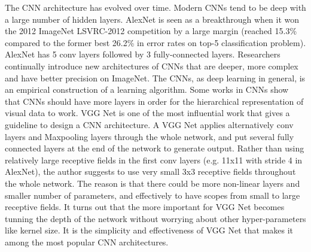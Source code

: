 The CNN architecture has evolved over time. Modern CNNs tend to be deep with a large number of hidden layers. AlexNet is seen as a breakthrough when it won the 2012 ImageNet LSVRC-2012 competition by a large margin (reached 15.3\% compared to the former best 26.2\% in error rates on top-5 classification problem). AlexNet has 5 conv layers followed by 3 fully-connected layers. Researchers continually introduce new architectures of CNNs that are deeper, more complex and have better precision on ImageNet. The CNNs, as deep learning in general, is an empirical construction of a learning algorithm. Some works in CNNs show that CNNs should have more layers in order for the hierarchical representation of visual data to work\cite{he2016deep}. VGG Net\cite{simonyan2014very} is one of the most influential work that gives a guideline to design a CNN architecture. A VGG Net applies alternatively conv layers and Maxpooling layers through the whole network, and put several fully connected layers at the end of the network to generate output. Rather than using relatively large receptive fields in the first conv layers (e.g. 11x11 with stride 4 in AlexNet\cite{krizhevsky2012imagenet}), the author suggests to use very small 3x3 receptive fields throughout the whole network. The reason is that there could be more non-linear layers and smaller number of parameters, and effectively to have scopes from small to large receptive fields. It turns out that the more important for VGG Net becomes tunning the depth of the network without worrying about other hyper-parameters like kernel size. It is the simplicity and effectiveness of VGG Net that makes it among the most popular CNN architectures. 

